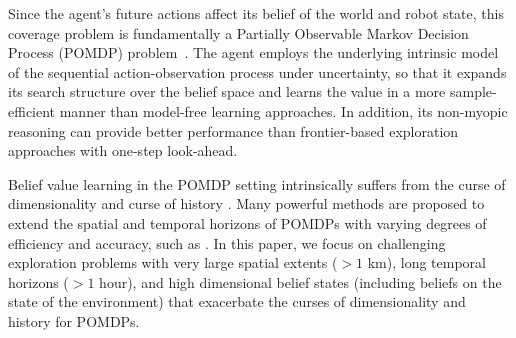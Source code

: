 \documentclass[letterpaper]{article} %
\newcommand{\phdone}[1]{} %
\begin{document}
\phdone{Problem description--POMDP perspective}
Since the agent's future actions affect its belief of the world and robot state, this coverage problem is fundamentally a Partially Observable Markov Decision Process (POMDP) problem~\cite{pomdps_monahan1982}.
The agent employs the underlying intrinsic model of the sequential action-observation process under uncertainty, so that it %
expands its search structure over the belief space and learns the value in a more sample-efficient manner than model-free learning approaches.
In addition, its non-myopic reasoning can provide better performance than frontier-based exploration approaches with one-step look-ahead.

\phdone{Gap in the state-of-the-art}
Belief value learning in the POMDP setting intrinsically suffers from the curse of dimensionality \cite{KLC98} and curse of history \cite{Pineau03}. Many powerful methods are proposed to extend the spatial and temporal horizons of POMDPs with varying degrees of efficiency and accuracy, such as \cite{silver2010monte,somani2013despot,bonet1998learning,kim2019pomhdp}. In this paper, we focus on challenging exploration problems with very large spatial extents ($>\!1$ km), long temporal horizons ($>\!1$ hour), and high dimensional belief states (including beliefs on the state of the environment) that exacerbate the curses of dimensionality and history for POMDPs. %
%
\end{document}
